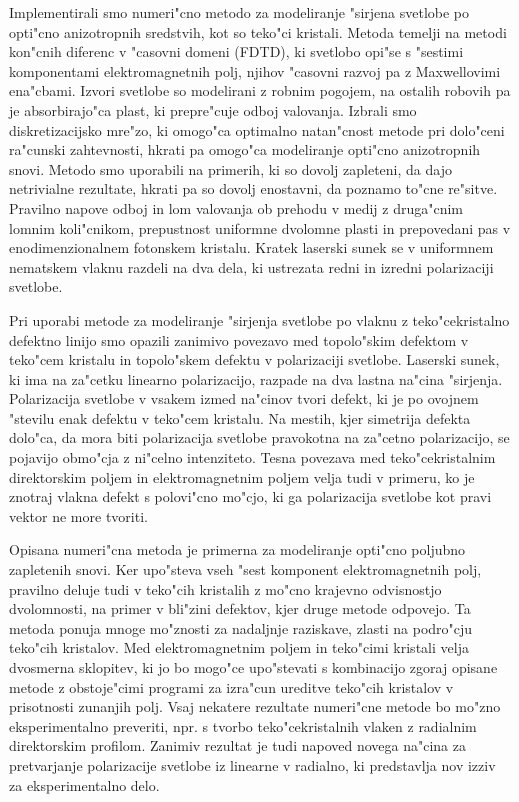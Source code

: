 \documentclass[12pt,twoside,openright,final]{report}
\begin{document}
Implementirali smo numeri"cno metodo za modeliranje "sirjena svetlobe po opti"cno anizotropnih sredstvih, kot so teko"ci kristali. 
Metoda temelji na metodi kon"cnih diferenc v "casovni domeni (FDTD), ki svetlobo opi"se s "sestimi komponentami elektromagnetnih polj, njihov "casovni razvoj pa z Maxwellovimi ena"cbami. 
Izvori svetlobe so modelirani z robnim pogojem, na ostalih robovih pa je absorbirajo"ca plast, ki prepre"cuje odboj valovanja. 
Izbrali smo diskretizacijsko mre"zo, ki omogo"ca optimalno natan"cnost metode pri dolo"ceni ra"cunski zahtevnosti, hkrati pa omogo"ca modeliranje opti"cno anizotropnih snovi. 
Metodo smo uporabili na primerih, ki so dovolj zapleteni, da dajo netrivialne rezultate, hkrati pa so dovolj enostavni, da poznamo to"cne re"sitve. 
Pravilno napove odboj in lom valovanja ob prehodu v medij z druga"cnim lomnim koli"cnikom, prepustnost uniformne dvolomne plasti in prepovedani pas v enodimenzionalnem fotonskem kristalu. 
Kratek laserski sunek se v uniformnem nematskem vlaknu razdeli na dva dela, ki ustrezata redni in izredni polarizaciji svetlobe. 

Pri uporabi metode za modeliranje "sirjenja svetlobe po vlaknu z teko"cekristalno defektno linijo smo opazili zanimivo povezavo med topolo"skim defektom v teko"cem kristalu in topolo"skem defektu v polarizaciji svetlobe. 
Laserski sunek, ki ima na za"cetku linearno polarizacijo, razpade na dva lastna na"cina "sirjenja. 
Polarizacija svetlobe v vsakem izmed na"cinov tvori defekt, ki je po ovojnem "stevilu enak defektu v teko"cem kristalu. 
Na mestih, kjer simetrija defekta dolo"ca, da mora biti polarizacija svetlobe pravokotna na za"cetno polarizacijo, se pojavijo obmo"cja z ni"celno intenziteto. 
Tesna povezava med teko"cekristalnim direktorskim poljem in elektromagnetnim poljem velja tudi v primeru, ko je znotraj vlakna defekt s polovi"cno mo"cjo, ki ga polarizacija svetlobe kot pravi vektor ne more tvoriti. 

Opisana numeri"cna metoda je primerna za modeliranje opti"cno poljubno zapletenih snovi. 
Ker upo"steva vseh "sest komponent elektromagnetnih polj, pravilno deluje tudi v teko"cih kristalih z mo"cno krajevno odvisnostjo dvolomnosti, na primer v bli"zini defektov, kjer druge metode odpovejo. 
Ta metoda ponuja mnoge mo"znosti za nadaljnje raziskave, zlasti na podro"cju teko"cih kristalov. 
Med elektromagnetnim poljem in teko"cimi kristali velja dvosmerna sklopitev, ki jo bo mogo"ce upo"stevati s kombinacijo zgoraj opisane metode z obstoje"cimi programi za izra"cun ureditve teko"cih kristalov v prisotnosti zunanjih polj. 
Vsaj nekatere rezultate numeri"cne metode bo mo"zno eksperimentalno preveriti, npr. s tvorbo teko"cekristalnih vlaken z radialnim direktorskim profilom. 
Zanimiv rezultat je tudi napoved novega na"cina za pretvarjanje polarizacije svetlobe iz linearne v radialno, ki predstavlja nov izziv za eksperimentalno delo. 



\end{document}
